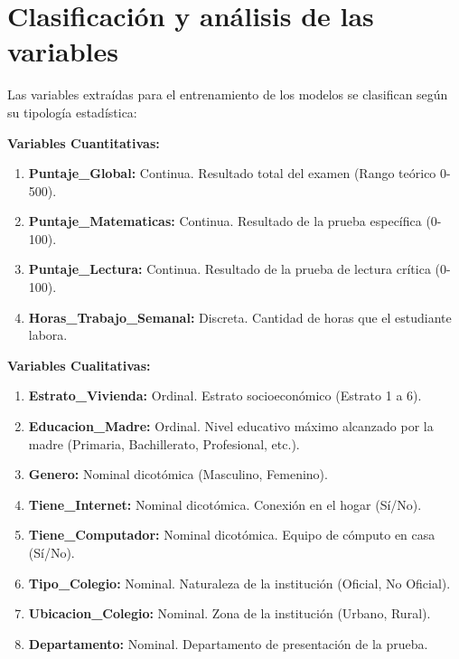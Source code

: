 \documentclass[12pt]{article}
\begin{document}
\section{Clasificación y análisis de las variables}
Las variables extraídas para el entrenamiento de los modelos se clasifican según su tipología estadística:

\textbf{Variables Cuantitativas:}
\begin{enumerate}
    \item \textbf{Puntaje\_Global:} Continua. Resultado total del examen (Rango teórico 0-500).
    \item \textbf{Puntaje\_Matematicas:} Continua. Resultado de la prueba específica (0-100).
    \item \textbf{Puntaje\_Lectura:} Continua. Resultado de la prueba de lectura crítica (0-100).
    \item \textbf{Horas\_Trabajo\_Semanal:} Discreta. Cantidad de horas que el estudiante labora.
\end{enumerate}

\textbf{Variables Cualitativas:}
\begin{enumerate}
    \item \textbf{Estrato\_Vivienda:} Ordinal. Estrato socioeconómico (Estrato 1 a 6).
    \item \textbf{Educacion\_Madre:} Ordinal. Nivel educativo máximo alcanzado por la madre (Primaria, Bachillerato, Profesional, etc.).
    \item \textbf{Genero:} Nominal dicotómica (Masculino, Femenino).
    \item \textbf{Tiene\_Internet:} Nominal dicotómica. Conexión en el hogar (Sí/No).
    \item \textbf{Tiene\_Computador:} Nominal dicotómica. Equipo de cómputo en casa (Sí/No).
    \item \textbf{Tipo\_Colegio:} Nominal. Naturaleza de la institución (Oficial, No Oficial).
    \item \textbf{Ubicacion\_Colegio:} Nominal. Zona de la institución (Urbano, Rural).
    \item \textbf{Departamento:} Nominal. Departamento de presentación de la prueba.
\end{enumerate}

\end{document}
